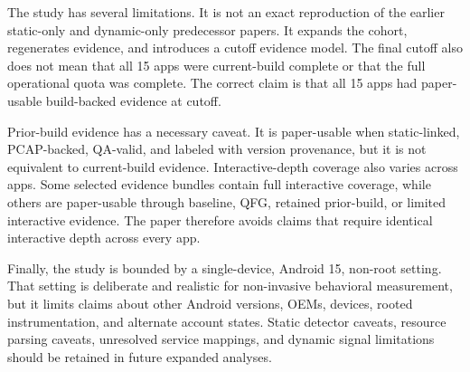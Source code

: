 The study has several limitations. It is not an exact reproduction of the earlier static-only and dynamic-only predecessor papers. It expands the cohort, regenerates evidence, and introduces a cutoff evidence model. The final cutoff also does not mean that all 15 apps were current-build complete or that the full operational quota was complete. The correct claim is that all 15 apps had paper-usable build-backed evidence at cutoff.

Prior-build evidence has a necessary caveat. It is paper-usable when static-linked, PCAP-backed, QA-valid, and labeled with version provenance, but it is not equivalent to current-build evidence. Interactive-depth coverage also varies across apps. Some selected evidence bundles contain full interactive coverage, while others are paper-usable through baseline, QFG, retained prior-build, or limited interactive evidence. The paper therefore avoids claims that require identical interactive depth across every app.

Finally, the study is bounded by a single-device, Android 15, non-root setting. That setting is deliberate and realistic for non-invasive behavioral measurement, but it limits claims about other Android versions, OEMs, devices, rooted instrumentation, and alternate account states. Static detector caveats, resource parsing caveats, unresolved service mappings, and dynamic signal limitations should be retained in future expanded analyses.
